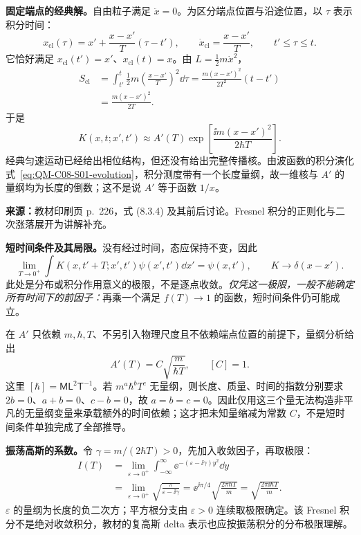 \textbf{固定端点的经典解。}自由粒子满足 $\ddot x=0$。为区分端点位置与沿途位置，以 $\tau$ 表示积分时间：
\begin{equation}
  x_{\mathrm{cl}}(\tau)=x'+\frac{x-x'}{T}(\tau-t'),\qquad
  \dot x_{\mathrm{cl}}=\frac{x-x'}{T},\qquad t'\leq\tau\leq t.
\end{equation}
它恰好满足 $x_{\mathrm{cl}}(t')=x'$、$x_{\mathrm{cl}}(t)=x$。由 $L=\tfrac12m\dot x^2$，
\begin{align}
  S_{\mathrm{cl}}
  &=\int_{t'}^t\frac12m\left(\frac{x-x'}{T}\right)^2\dd\tau
    =\frac{m(x-x')^2}{2T^2}(t-t')\\
  &=\boxed{\frac{m(x-x')^2}{2T}}.
\end{align}
于是
\begin{equation}
  K(x,t;x',t')\approx A'(T)
    \exp\!\left[\frac{\ii m(x-x')^2}{2\hbar T}\right].
\end{equation}
经典匀速运动已经给出相位结构，但还没有给出完整传播核。由波函数的积分演化式~\eqref{eq:QM-C08-S01-evolution}，积分测度带有一个长度量纲，故一维核与 $A'$ 的量纲均为长度的倒数；这不是说 $A'$ 等于函数 $1/x$。

\textbf{来源：}教材印刷页 p.~226，式 (8.3.4) 及其前后讨论。Fresnel 积分的正则化与二次涨落展开为讲解补充。

\textbf{短时间条件及其局限。}没有经过时间，态应保持不变，因此
\begin{equation}
  \lim_{T\to0^+}\int K(x,t'+T;x',t')\psi(x',t')\dd x'
  =\psi(x,t'),\qquad K\longrightarrow\delta(x-x').
  \label{eq:QM-C08-S03-initial}
\end{equation}
此处是分布或积分作用意义的极限，不是逐点收敛。\emph{仅凭这一极限，一般不能确定所有时间下的前因子：}再乘一个满足 $f(T)\to1$ 的函数，短时间条件仍可能成立。

在 $A'$ 只依赖 $m,\hbar,T$、不另引入物理尺度且不依赖端点位置的前提下，量纲分析给出
\begin{equation}
  A'(T)=C\sqrt{\frac{m}{\hbar T}},\qquad [C]=1.
\end{equation}
这里 $[\hbar]=\mathsf M\mathsf L^2\mathsf T^{-1}$。若 $m^a\hbar^bT^c$ 无量纲，则长度、质量、时间的指数分别要求 $2b=0$、$a+b=0$、$c-b=0$，故 $a=b=c=0$。因此仅用这三个量无法构造非平凡的无量纲变量来承载额外的时间依赖；这才把未知量缩减为常数 $C$，不是短时间条件单独完成了全部推导。

\textbf{振荡高斯的系数。}令 $\gamma=m/(2\hbar T)>0$，先加入收敛因子，再取极限：
\begin{align}
  I(T)&=\lim_{\varepsilon\to0^+}\int_{-\infty}^{\infty}
     \ee^{-(\varepsilon-\ii\gamma)y^2}\dd y\\
  &=\lim_{\varepsilon\to0^+}\sqrt{\frac{\pi}{\varepsilon-\ii\gamma}}
    =\ee^{\ii\pi/4}\sqrt{\frac{2\pi\hbar T}{m}}
    =\sqrt{\frac{2\pi\ii\hbar T}{m}}.
\end{align}
$\varepsilon$ 的量纲为长度的负二次方；平方根分支由 $\varepsilon>0$ 连续取极限确定。该 Fresnel 积分不是绝对收敛积分，教材的复高斯 delta 表示也应按振荡积分的分布极限理解。

